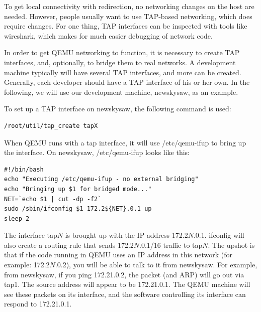 \documentclass[11pt]{article}
\begin{document}
To get local connectivity with redirection, no networking changes on
the host are needed.  However, people usually want to use TAP-based
networking, which does require changes.  For one thing, TAP interfaces
can be inspected with tools like wireshark, which makes for much
easier debugging of network code.

In order to get QEMU networking to function, it is necessary to create
TAP interfaces, and, optionally, to bridge them to real networks.  A
development machine typically will have several TAP interfaces, and
more can be created.  Generally, each developer should have a TAP
interface of his or her own.  In the following, we will use our
development machine, newskysaw, as an example.

To set up a TAP interface on newskysaw, the following command is used:
\begin{verbatim}
/root/util/tap_create tapX
\end{verbatim}

When QEMU runs with a tap interface, it will use /etc/qemu-ifup to
bring up the interface.  On newskysaw, /etc/qemu-ifup looks like this:

\begin{verbatim}
#!/bin/bash
echo "Executing /etc/qemu-ifup - no external bridging"
echo "Bringing up $1 for bridged mode..."
NET=`echo $1 | cut -dp -f2` 
sudo /sbin/ifconfig $1 172.2${NET}.0.1 up
sleep 2
\end{verbatim}

The interface tap$N$ is brought up with the IP address 172.2$N$.0.1.
ifconfig will also create a routing rule that sends 172.2$N$.0.1/16
traffic to tap$N$.  The upshot is that if the code running in QEMU
uses an IP address in this network (for example: 172.2$N$.0.2), you
will be able to talk to it from newskysaw.  For example, from
newskysaw, if you ping 172.21.0.2, the packet (and ARP) will go out via
tap1.  The source address will appear to be 172.21.0.1.  The QEMU
machine will see these packets on its interface, and the software
controlling its interface can respond to 172.21.0.1.  
\end{document}
